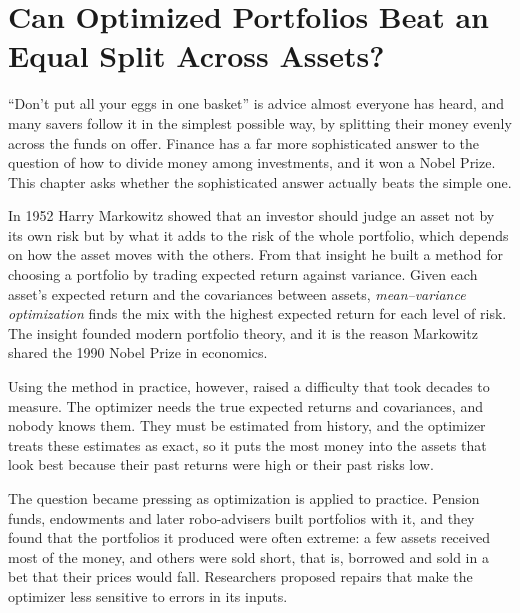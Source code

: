 \makeatletter
\makeatother

\chapter{Can Optimized Portfolios Beat an Equal Split Across Assets?}
\label{ch:09}
\providecommand{\term}[1]{\emph{#1}}

``Don't put all your eggs in one basket'' is advice almost everyone has heard, and many savers follow it in the simplest possible way, by splitting their money evenly across the funds on offer. Finance has a far more sophisticated answer to the question of how to divide money among investments, and it won a Nobel Prize. This chapter asks whether the sophisticated answer actually beats the simple one.

In 1952 Harry Markowitz showed that an investor should judge an asset not by its own risk but by what it adds to the risk of the whole portfolio, which depends on how the asset moves with the others. From that insight he built a method for choosing a portfolio by trading expected return against variance. Given each asset's expected return and the covariances between assets, \term{mean--variance optimization} finds the mix with the highest expected return for each level of risk. The insight founded modern portfolio theory, and it is the reason Markowitz shared the 1990 Nobel Prize in economics. 

Using the method in practice, however, raised a difficulty that took decades to measure. The optimizer needs the true expected returns and covariances, and nobody knows them. They must be estimated from history, and the optimizer treats these estimates as exact, so it puts the most money into the assets that look best because their past returns were high or their past risks low.

The question became pressing as optimization is applied to practice. Pension funds, endowments and later robo-advisers built portfolios with it, and they found that the portfolios it produced were often extreme: a few assets received most of the money, and others were sold short, that is, borrowed and sold in a bet that their prices would fall. Researchers proposed repairs that make the optimizer less sensitive to errors in its inputs. 

